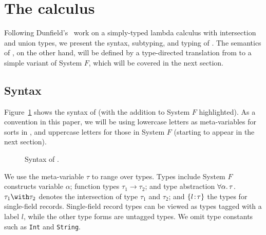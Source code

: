\section{The \name calculus} \label{sec:fi}

Following Dunfield's~\cite{dunfield2014elaborating} work on a simply-typed
lambda calculus with intersection and union types, we present the syntax,
subtyping, and typing of \name. The semantics of \name, on the other hand, will
be defined by a type-directed translation from \name to a simple variant of
System $F$, which will be covered in the next section.

\subsection{Syntax}

Figure~\ref{fig:fi-syntax} shows the syntax of \name (with the addition to
System $F$ highlighted). As a convention in this paper, we will be using
lowercase letters as meta-variables for sorts in \name, and uppercase letters
for those in System $F$ (starting to appear in the next section).


\begin{figure}[h]
  
  \caption{Syntax of \name.}
  \label{fig:fi-syntax}
\end{figure}

We use the meta-variable $\tau$ to range over types. Types include System $F$
constructs variable $ \alpha $; function types $ \tau_1 \to \tau_2 $; and type
abstraction $ \forall \alpha. \, \tau $. $ \tau_1 \andop \tau_2 $ denotes the
intersection of type $ \tau_1 $ and $ \tau_2 $; and $ \{ l \!:\! \tau \} $ the types
for single-field records. Single-field record types can be viewed as types
tagged with a label $l$, while the other type forms are untagged types. We omit
type constants such as \lstinline$Int$ and \lstinline$String$.

